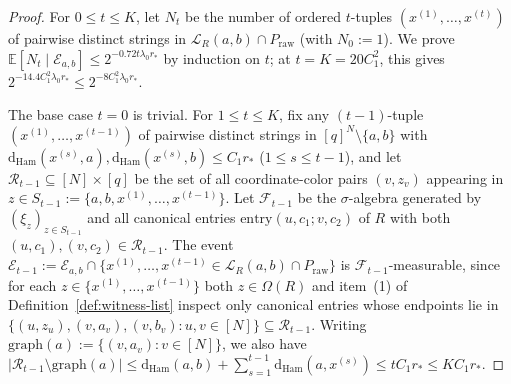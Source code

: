 \documentclass[11pt]{article}
\theoremstyle{definition}
\theoremstyle{remark}
\newcommand{\Ham}{\mathrm{Ham}}
\newcommand{\dHam}{\mathrm{d}_{\Ham}}
\begin{document}
\begin{proof}
For $0 \le t \le K$, let $N_t$ be the number of ordered $t$-tuples $(x^{(1)}, \dots, x^{(t)})$ of pairwise distinct strings in $\mathcal{L}_R(a, b) \cap P_{\mathrm{raw}}$ (with $N_0 := 1$). We prove $\mathbb{E}[N_t \mid \mathcal{E}_{a, b}] \le 2^{-0.72 t \lambda_0 r_*}$ by induction on $t$; at $t = K = 20 C_1^2$, this gives $2^{-14.4 C_1^2 \lambda_0 r_*} \le 2^{-8 C_1^2 \lambda_0 r_*}$.

The base case $t = 0$ is trivial. For $1 \le t \le K$, fix any $(t - 1)$-tuple $(x^{(1)}, \dots, x^{(t-1)})$ of pairwise distinct strings in $[q]^N \setminus \{a, b\}$ with $\dHam(x^{(s)}, a), \dHam(x^{(s)}, b) \le C_1 r_*$ ($1 \le s \le t - 1$), and let $\mathcal{R}_{t-1} \subseteq [N] \times [q]$ be the set of all coordinate-color pairs $(v, z_v)$ appearing in $z \in S_{t-1} := \{a, b, x^{(1)}, \dots, x^{(t-1)}\}$. Let $\mathcal{F}_{t-1}$ be the $\sigma$-algebra generated by $(\xi_z)_{z \in S_{t-1}}$ and all canonical entries $\mathrm{entry}(u, c_1; v, c_2)$ of $R$ with both $(u, c_1), (v, c_2) \in \mathcal{R}_{t-1}$. The event $\mathcal{E}_{t-1} := \mathcal{E}_{a, b} \cap \{x^{(1)}, \dots, x^{(t-1)} \in \mathcal{L}_R(a, b) \cap P_{\mathrm{raw}}\}$ is $\mathcal{F}_{t-1}$-measurable, since for each $z \in \{x^{(1)}, \dots, x^{(t-1)}\}$ both $z \in \Omega(R)$ and item~(1) of Definition~\ref{def:witness-list} inspect only canonical entries whose endpoints lie in $\{(u, z_u), (v, a_v), (v, b_v) : u, v \in [N]\} \subseteq \mathcal{R}_{t-1}$. Writing $\mathrm{graph}(a) := \{(v, a_v) : v \in [N]\}$, we also have $|\mathcal{R}_{t-1} \setminus \mathrm{graph}(a)| \le \dHam(a, b) + \sum_{s=1}^{t-1} \dHam(a, x^{(s)}) \le t C_1 r_* \le K C_1 r_*$.


\end{proof}
\end{document}
